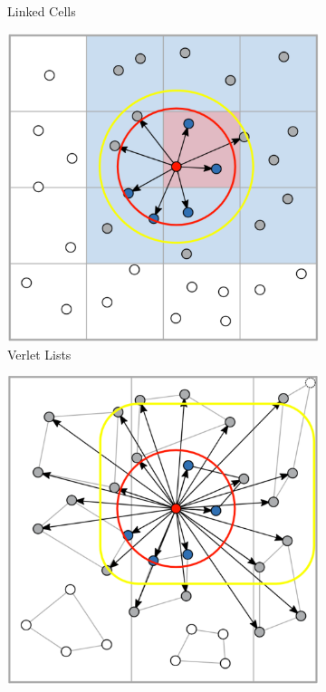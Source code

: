 \begin{figure}[h!]
\begin{subfigure}{0.22\textwidth}
        \caption{\scriptsize Linked Cells}
        \label{fig:linkedcells}
    \end{subfigure}
    \hfill
    \begin{subfigure}{0.22\textwidth}
        \centering
        \includegraphics[width=\linewidth]{imgs/verletlists.png}
        \caption{\scriptsize Verlet Lists}
        \label{fig:verletlists}
    \end{subfigure}
    \hfill
    \begin{subfigure}{0.22\textwidth}
        \centering
        \includegraphics[width=\linewidth]{imgs/verletclusters.png}

\end{subfigure}
\end{figure}
